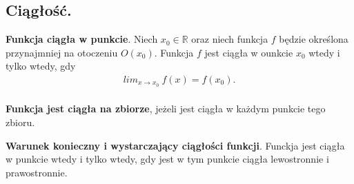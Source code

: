 \documentclass[12pt]{article}
\begin{document}
    \subsection{Ciągłość.}

    \begin{definition}
        \textbf{Funkcja ciągła w punkcie}. Niech $x_0 \in \mathbb{R}$ oraz niech funkcja $f$ będzie określona przynajmniej
        na otoczeniu $O(x_0)$. Funkcja $f$ jest ciągła w ounkcie $x_0$ wtedy i tylko wtedy, gdy
        \begin{align*}
            lim_{x \rightarrow x_0} ~ f(x) = f(x_0).
        \end{align*}
        \hfill \\

        \textbf{Funkcja jest ciągła na zbiorze}, jeżeli jest ciągła w każdym punkcie tego zbioru.
    \end{definition}

    \begin{theorem}
        \textbf{Warunek konieczny i wystarczający ciągłości funkcji}. Funckja jest ciągła w punkcie wtedy i tylko wtedy,
        gdy jest w tym punkcie ciągła lewostronnie i prawostronnie.
    \end{theorem}
\end{document}

